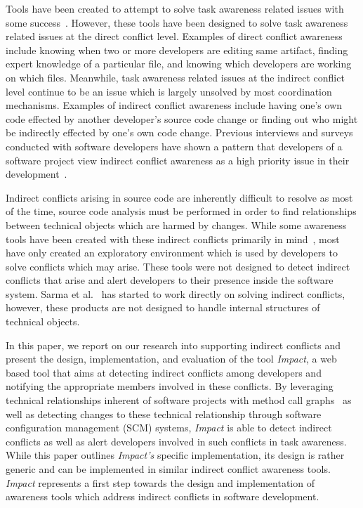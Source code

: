 \documentclass[conference]{IEEEtran}
\begin{document}
Tools have been created to attempt to solve task awareness related issues
with some success~\cite{Xiang:2008:ERT, Biehl:2007:FVD, Sarma:2009:TIV, Khurana:2009:PFC}. However, these tools have been designed 
to solve task awareness related issues at the direct conflict level. 
Examples of direct conflict awareness include knowing when two or more 
developers are  editing same artifact, finding expert knowledge of a
particular file, and knowing which developers are working on which files.
Meanwhile, task awareness related issues at the indirect conflict level
continue to be an issue which is largely unsolved by most coordination
mechanisms. Examples of indirect conflict awareness
include having one's own code effected by another developer's source
code change or finding out who might be indirectly effected by one's
own code change. Previous interviews and surveys conducted with software developers have 
shown a pattern that developers of a software project view indirect conflict 
awareness  as a high priority issue in their development~\cite{Damian:2007:GSE, 
Halverson:2006:DTV, Begel:2010:CDE, Schroter:2012:TTF}.

Indirect conflicts arising in source code are inherently
difficult to resolve as most of the time, source code analysis must
be performed in order to find relationships between technical objects
which are harmed by changes.
While some awareness tools have been created with these indirect conflicts
primarily in mind~\cite{Begel:2010:CDE, Trainer:2005:BGT}, most have only 
created an exploratory environment which is used by developers to
solve conflicts which may arise. These tools were not designed to detect
indirect conflicts that arise and alert developers to their presence 
inside the software system. Sarma et al.~\cite{Sarma:2007:TSA} has started to work directly
on solving indirect conflicts, however, these products are not designed to handle
internal structures of technical objects.

In this paper, we report on our research into supporting indirect conflicts
and present the design, implementation, and evaluation of the tool \textit{Impact},
a web based tool that aims at detecting indirect conflicts among developers
and notifying the appropriate members involved in these conflicts.
By leveraging technical relationships inherent of 
software projects with method call graphs~\cite{Lakhotia:1993:CCM}
as well as detecting changes
to these technical relationship through software configuration management
(SCM) systems, \textit{Impact} is able to detect indirect conflicts as well as
alert developers involved in such conflicts in task awareness. While this paper
outlines \textit{Impact's} specific implementation, its design is rather
generic and can be implemented in similar indirect conflict awareness tools.
\textit{Impact} represents a first step towards the design and implementation
of awareness tools which address indirect conflicts in software development.
\end{document}
